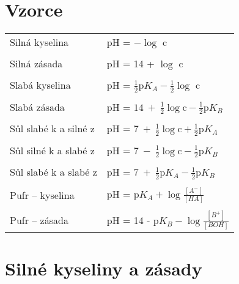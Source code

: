 \section{Vzorce}

\begin{tabular}{ll}
	Silná kyselina & pH = $-\log$ c \\
	& \\
	Silná zásada & pH = 14 + $\log$ c \\
	& \\
	Slabá kyselina & pH = $\frac{1}{2}\textrm{p}K_A-\frac{1}{2}\log$ c \\
	& \\
	Slabá zásada & pH = $14\ +\ \frac{1}{2}\log\textrm{c} - \frac{1}{2}\textrm{p}K_B$ \\
	& \\
	Sůl slabé k a silné z & pH = $7\ +\ \frac{1}{2}\log\textrm{c} + \frac{1}{2}\textrm{p}K_A$ \\
	& \\
	Sůl silné k a slabé z & pH = $7\ -\ \frac{1}{2}\log\textrm{c} - \frac{1}{2}\textrm{p}K_B$ \\
	& \\
	Sůl slabé k a slabé z & pH = $7\ +\ \frac{1}{2}\textrm{p}K_A - \frac{1}{2}\textrm{p}K_B$ \\
	& \\
	Pufr -- kyselina & pH = $\textrm{p}K_A + \log \frac{[A^-]}{[HA]}$ \\
	& \\
	Pufr -- zásada & pH = 14 - $\textrm{p}K_B - \log \frac{[B^+]}{[BOH]}$ \\
\end{tabular}
\pagebreak

\section{Silné kyseliny a zásady}


\clearpage